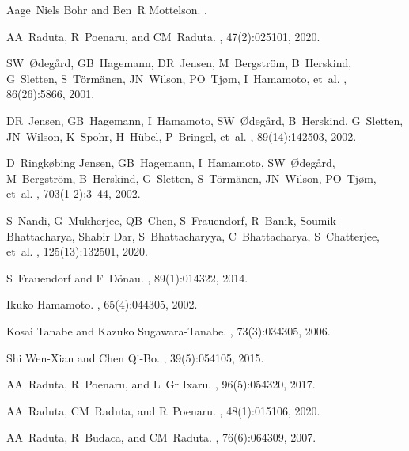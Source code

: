 \documentclass[myclassdoc,debug]{rjparticle}
\begin{document}
\begin{thebibliography}{99}

Aage~Niels Bohr and Ben~R Mottelson.
.

AA~Raduta, R~Poenaru, and CM~Raduta.
,
  47(2):025101, 2020.

SW~{\O}deg{\aa}rd, GB~Hagemann, DR~Jensen, M~Bergstr{\"o}m, B~Herskind,
  G~Sletten, S~T{\"o}rm{\"a}nen, JN~Wilson, PO~Tj{\o}m, I~Hamamoto, et~al.
, 86(26):5866, 2001.

DR~Jensen, GB~Hagemann, I~Hamamoto, SW~{\O}deg{\aa}rd, B~Herskind, G~Sletten,
  JN~Wilson, K~Spohr, H~H{\"u}bel, P~Bringel, et~al.
, 89(14):142503, 2002.

D~Ringk{\o}bing Jensen, GB~Hagemann, I~Hamamoto, SW~{\O}deg{\aa}rd,
  M~Bergstr{\"o}m, B~Herskind, G~Sletten, S~T{\"o}rm{\"a}nen, JN~Wilson,
  PO~Tj{\o}m, et~al.
, 703(1-2):3--44, 2002.

S~Nandi, G~Mukherjee, QB~Chen, S~Frauendorf, R~Banik, Soumik Bhattacharya,
  Shabir Dar, S~Bhattacharyya, C~Bhattacharya, S~Chatterjee, et~al.
, 125(13):132501, 2020.

S~Frauendorf and F~D{\"o}nau.
, 89(1):014322, 2014.

Ikuko Hamamoto.
, 65(4):044305, 2002.

Kosai Tanabe and Kazuko Sugawara-Tanabe.
, 73(3):034305, 2006.

Shi Wen-Xian and Chen Qi-Bo.
, 39(5):054105, 2015.

AA~Raduta, R~Poenaru, and L~Gr Ixaru.
, 96(5):054320, 2017.

AA~Raduta, CM~Raduta, and R~Poenaru.
,
  48(1):015106, 2020.

AA~Raduta, R~Budaca, and CM~Raduta.
, 76(6):064309, 2007.


\end{thebibliography}
\end{document}
